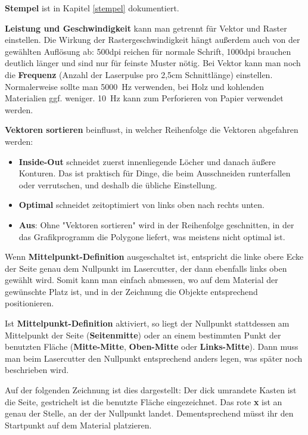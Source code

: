 \documentclass{\basedir/fablab-document}
\begin{document}
	\textbf{Stempel} ist in Kapitel \ref{stempel} dokumentiert.

	\textbf{Leistung und Geschwindigkeit} kann man getrennt für Vektor und Raster einstellen. Die Wirkung der Rastergeschwindigkeit hängt außerdem auch von der gewählten Auflösung ab: 500dpi reichen für normale Schrift, 1000dpi brauchen deutlich länger und sind nur für feinste Muster nötig. Bei Vektor kann man noch die \textbf{Frequenz} (Anzahl der Laserpulse pro 2,5cm Schnittlänge) einstellen. Normalerweise sollte man 5000~Hz verwenden, bei Holz und kohlenden Materialien ggf. weniger. 10~Hz kann zum Perforieren von Papier verwendet werden. %

	\textbf{Vektoren sortieren} beinflusst, in welcher Reihenfolge die Vektoren abgefahren werden:
	\begin{itemize}
		\item \textbf{Inside-Out} schneidet zuerst innenliegende Löcher und danach äußere Konturen.  Das ist praktisch für Dinge, die beim Ausschneiden runterfallen oder verrutschen, und deshalb die übliche Einstellung.
		\item \textbf{Optimal} schneidet zeitoptimiert von links oben nach rechts unten.
		\item \textbf{Aus}: Ohne "Vektoren sortieren" wird in der Reihenfolge geschnitten, in der das Grafikprogramm die Polygone liefert, was meistens nicht optimal ist.
	\end{itemize}


	Wenn \textbf{Mittelpunkt-Definition} ausgeschaltet ist, entspricht die linke obere Ecke der Seite genau dem Nullpunkt im Lasercutter, der dann ebenfalls links oben gewählt wird. Somit kann man einfach abmessen, wo auf dem Material der gewünschte Platz ist, und in der Zeichnung die Objekte entsprechend positionieren.

	Ist \textbf{Mittelpunkt-Definition} aktiviert, so liegt der Nullpunkt stattdessen am Mittelpunkt der Seite (\textbf{Seiten\-mitte}) oder an einem bestimmten Punkt der benutzten Fläche (\textbf{Mitte-Mitte}, \textbf{Oben-Mitte} oder \textbf{Links-Mitte}). Dann muss man beim Lasercutter den Nullpunkt entsprechend anders legen, was später noch beschrieben wird.

	Auf der folgenden Zeichnung ist dies dargestellt: Der dick umrandete Kasten ist die Seite, gestrichelt ist die benutzte Fläche eingezeichnet. Das rote \textbf{x} ist an genau der Stelle, an der der Nullpunkt landet. Dementsprechend müsst ihr den Startpunkt auf dem Material platzieren.
\end{document}
